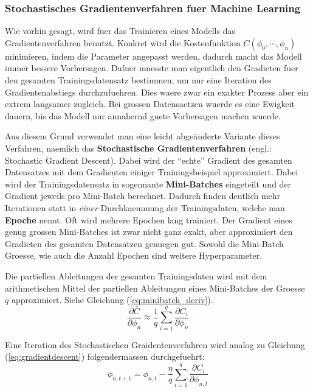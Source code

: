 \documentclass[../main]{subfiles}
\begin{document}
\subsubsection{Stochastisches Gradientenverfahren fuer Machine Learning}
Wie vorhin gesagt, wird fuer das Trainieren eines Modells das Gradientenverfahren benutzt.
Konkret wird die Kostenfunktion $C(\phi_0,\cdots,\phi_n)$ minimieren, indem die Parameter angepasst werden, dadurch macht das Modell immer bessere Vorhersagen.
Dafuer muesste man eigentlich den Gradieten fuer den gesamten Trainingsdatensatz bestimmen, um nur eine Iteration des Gradientenabstiegs durchzufuehren.
Dies waere zwar ein exakter Prozess aber ein extrem langsamer zugleich.
Bei grossen Datensaetzen wuerde es eine Ewigkeit dauern, bis das Modell nur annahernd guete Vorhersagen machen wuerde.
\par\medskip
Aus diesem Grund verwendet man eine leicht abgeänderte Variante dieses Verfahren, naemlich das \textbf{Stochastische Gradientenverfahren} (engl.: Stochastic Gradient Descent).
Dabei wird der ``echte'' Gradient des gesamten Datensatzes mit dem Gradienten einiger Trainingsbeispiel approximiert.
Dabei wird der Trainingsdatensatz in sogennante \textbf{Mini-Batches} eingeteilt und der Gradient jeweils pro Mini-Batch berechnet. 
Dadurch finden deutlich mehr Iterationen statt in \textit{einer} Durchkaemmung der Trainingsdaten, welche man \textbf{Epoche} nennt. Oft wird mehrere Epochen lang trainiert. 
Der Gradient eines genug grossen Mini-Batches ist zwar nicht ganz exakt, aber approximiert den Gradieten des gesamten Datensatzen genuegen gut.
Sowohl die Mini-Batch Groesse, wie auch die Anzahl Epochen sind weitere Hyperparameter.
\par\medskip
Die partiellen Ableitungen der gesamten Trainingsdaten wird mit dem arithmetischen Mittel der partiellen Ableitungen eines Mini-Batches der Groesse $q$ approximiert. Siehe Gleichung (\ref{eq:minibatch_deriv}).
\begin{equation}\label{eq:minibatch_deriv}
    \frac{\partial\bar{C}}{\partial\phi_n} \approx \frac{1}{q}\sum_{i=1}^{q} \frac{\partial C_i}{\partial\phi_n}
\end{equation}

Eine Iteration des Stochastischen Graidentenverfahren wird analog zu Gleichung (\ref{eq:gradientdescent}) folgendermassen durchgefuehrt:
\begin{equation}\label{eq:sgd}
    \phi_{n,t+1} = \phi_{n,t} - \frac{\eta}{q} \sum_{i=1}^{q} \frac{\partial C_i}{\partial \phi_{n,t}}
\end{equation}
\end{document}
